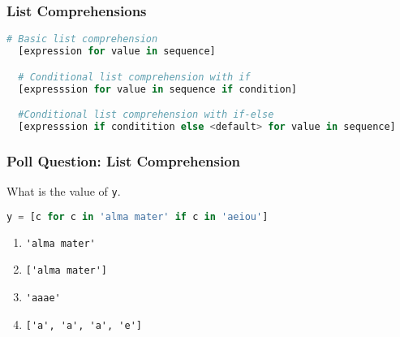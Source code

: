 \documentclass{beamer}
\begin{document}
%
%
\begin{frame}[fragile]
  \frametitle{List Comprehensions}
  \begin{lstlisting}[language=Python, autogobble]
  # Basic list comprehension
  [expression for value in sequence]

  # Conditional list comprehension with if
  [expresssion for value in sequence if condition]

  #Conditional list comprehension with if-else
  [expresssion if conditition else <default> for value in sequence]
  \end{lstlisting}
\end{frame}

%
%
\begin{frame}[fragile]
  \frametitle{Poll Question: List Comprehension}
  What is the value of \lstinline|y|.
  \begin{lstlisting}[language=Python, autogobble]
  y = [c for c in 'alma mater' if c in 'aeiou']
  \end{lstlisting}
  \vfill
  \begin{enumerate}[A]
    \item \lstinline|'alma mater'|
    \item \lstinline|['alma mater']|
    \item \lstinline|'aaae'|
    \item \lstinline|['a', 'a', 'a', 'e']|
  \end{enumerate}
\end{frame}
\end{document}
